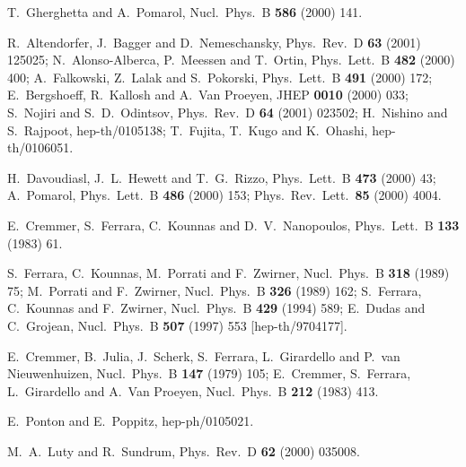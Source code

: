 \documentclass[a4paper,12pt]{article}
\begin{document}
\begin{thebibliography}{99}
T.~Gherghetta and A.~Pomarol,
Nucl.\ Phys.\ B {\bf 586} (2000) 141.


R.~Altendorfer, J.~Bagger and D.~Nemeschansky,
Phys.\ Rev.\ D {\bf 63} (2001) 125025;
N.~Alonso-Alberca, P.~Meessen and T.~Ortin,
Phys.\ Lett.\ B {\bf 482} (2000) 400;
A.~Falkowski, Z.~Lalak and S.~Pokorski,
Phys.\ Lett.\ B {\bf 491} (2000) 172;
E.~Bergshoeff, R.~Kallosh and A.~Van Proeyen,
JHEP {\bf 0010} (2000) 033;
S.~Nojiri and S.~D.~Odintsov,
Phys.\ Rev.\ D {\bf 64} (2001) 023502;
H.~Nishino and S.~Rajpoot,
hep-th/0105138;
T.~Fujita, T.~Kugo and K.~Ohashi,
hep-th/0106051.



H.~Davoudiasl, J.~L.~Hewett and T.~G.~Rizzo,
Phys.\ Lett.\ B {\bf 473} (2000) 43;
A.~Pomarol,
Phys.\ Lett.\ B {\bf 486} (2000) 153;
Phys.\ Rev.\ Lett.\  {\bf 85} (2000) 4004.



E.~Cremmer, S.~Ferrara, C.~Kounnas and D.~V.~Nanopoulos,
Phys.\ Lett.\ B {\bf 133} (1983) 61.


S.~Ferrara, C.~Kounnas, M.~Porrati and F.~Zwirner,
Nucl.\ Phys.\ B {\bf 318} (1989) 75;
M.~Porrati and F.~Zwirner,
Nucl.\ Phys.\ B {\bf 326} (1989) 162;
S.~Ferrara, C.~Kounnas and F.~Zwirner,
Nucl.\ Phys.\ B {\bf 429} (1994) 589;
E.~Dudas and C.~Grojean,
Nucl.\ Phys.\ B {\bf 507} (1997) 553
[hep-th/9704177].




E.~Cremmer, B.~Julia, J.~Scherk, S.~Ferrara, L.~Girardello and P.~van Nieuwenhuizen,
Nucl.\ Phys.\ B {\bf 147} (1979) 105;
E.~Cremmer, S.~Ferrara, L.~Girardello and A.~Van Proeyen,
Nucl.\ Phys.\ B {\bf 212} (1983) 413.




E.~Ponton and E.~Poppitz,
hep-ph/0105021.


M.~A.~Luty and R.~Sundrum,
Phys.\ Rev.\ D {\bf 62} (2000) 035008.




\end{thebibliography}
\end{document}
